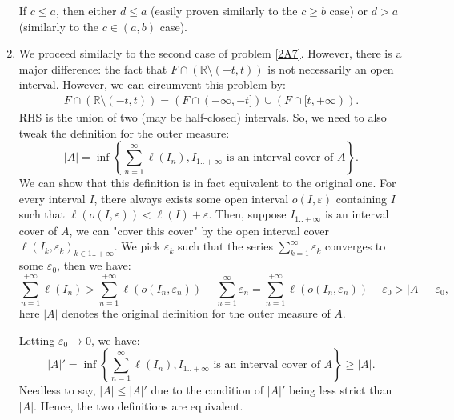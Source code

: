 \begin{enumerate}[label=\textbf{2A.\arabic*}]
    If \( c \le a \), then either \( d \le a \) (easily proven similarly to the
    \( c \ge b \) case) or \( d > a \) (similarly to the \( c \in (a, b) \)
    case).
  \item \label{2A8} We proceed similarly to the second case of problem
    \ref{2A7}. However,
    there is a major difference: the fact that \( F \cap  (\mathbb{R}
    \setminus (-t, t)) \) is not necessarily an open interval. However, we can
    circumvent this problem by:
    \begin{align*}
      F \cap  (\mathbb{R} \setminus (-t, t)) = (F \cap (-\infty, -t]) \cup  (F \cap
      [t, +\infty))
    .\end{align*}
    RHS is the union of two (may be half-closed) intervals. So, we need to also
    tweak the definition for the outer measure:
    \[
      |A| = \inf \left\{ \sum_{n=1}^{\infty} \ell(I_{n}),
      I_{1..+\infty} \text{ is an interval cover of } A
    \right\}
    .\] 
    We can show that this definition is in fact equivalent to the original one.
    For every interval \( I \), there always exists some open interval \( o(I,
    \varepsilon) \) containing \( I \) such that \( \ell(o(I, \varepsilon)) <
    \ell(I) + \varepsilon \).  Then, suppose \( I_{1..+\infty} \) is an interval
    cover of \( A \), we can "cover this cover" by the open interval cover \(
    \ell(I_{k}, \varepsilon_{k})_{k \in 1..+\infty} \). We pick \(
    \varepsilon_{k} \) such that the series \( \sum_{k=1}^{\infty}
    \varepsilon_{k} \) converges to some \( \varepsilon_{0} \), then we have:
    \[
      \sum_{n = 1}^{+\infty} \ell(I_{n})
      >
      \sum_{n = 1}^{+\infty} \ell(o(I_{n}, \varepsilon_{n})) - \sum_{n =
      1}^{\infty} \varepsilon_{n} = \sum_{n = 1}^{+\infty} \ell(o(I_{n},
      \varepsilon_{n}))  - \varepsilon_{0} > |A| -\varepsilon_{0}
    ,\] here \( |A| \) denotes the original definition for the outer measure of
    \( A \).

    Letting \( \varepsilon_{0} \to 0 \), we have:
    \[
      |A|' = \inf \left\{ \sum_{n=1}^{\infty} \ell(I_{n}),
      I_{1..+\infty} \text{ is an interval cover of } A  \right\} \ge |A|
    .\] 
    Needless to say, \( |A| \le |A|' \) due to the condition of \( |A|' \)
    being less strict than \( |A| \). Hence, the two definitions are equivalent.


\end{enumerate}

